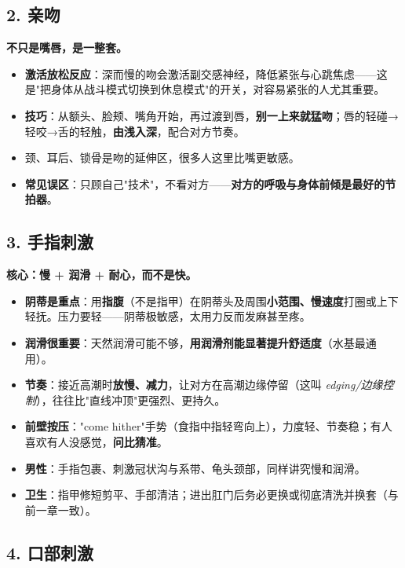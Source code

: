 \documentclass[12pt,UTF8,openany]{ctexbook}
\begin{document}
\subsection*{2. 亲吻}

\textbf{不只是嘴唇，是一整套。}

\begin{itemize}[leftmargin=2em,itemsep=0.3em]
  \item \textbf{激活放松反应}：深而慢的吻会激活副交感神经，降低紧张与心跳焦虑——这是"把身体从战斗模式切换到休息模式"的开关，对容易紧张的人尤其重要。
  \item \textbf{技巧}：从额头、脸颊、嘴角开始，再过渡到唇，\textbf{别一上来就猛吻}；唇的轻碰→轻咬→舌的轻触，\textbf{由浅入深}，配合对方节奏。
  \item 颈、耳后、锁骨是吻的延伸区，很多人这里比嘴更敏感。
  \item \textbf{常见误区}：只顾自己"技术"，不看对方——\textbf{对方的呼吸与身体前倾是最好的节拍器}。
\end{itemize}

\subsection*{3. 手指刺激}

\textbf{核心：慢 + 润滑 + 耐心，而不是快。}

\begin{itemize}[leftmargin=2em,itemsep=0.3em]
  \item \textbf{阴蒂是重点}：用\textbf{指腹}（不是指甲）在阴蒂头及周围\textbf{小范围、慢速度}打圈或上下轻抚。压力要轻——阴蒂极敏感，太用力反而发麻甚至疼。
  \item \textbf{润滑很重要}：天然润滑可能不够，\textbf{用润滑剂能显著提升舒适度}（水基最通用）。
  \item \textbf{节奏}：接近高潮时\textbf{放慢、减力}，让对方在高潮边缘停留（这叫 \emph{edging/边缘控制}），往往比"直线冲顶"更强烈、更持久。
  \item \textbf{前壁按压}："come hither"手势（食指中指轻弯向上），力度轻、节奏稳；有人喜欢有人没感觉，\textbf{问比猜准}。
  \item \textbf{男性}：手指包裹、刺激冠状沟与系带、龟头颈部，同样讲究慢和润滑。
  \item \textbf{卫生}：指甲修短剪平、手部清洁；进出肛门后务必更换或彻底清洗并换套（与前一章一致）。
\end{itemize}

\subsection*{4. 口部刺激}
\end{document}
